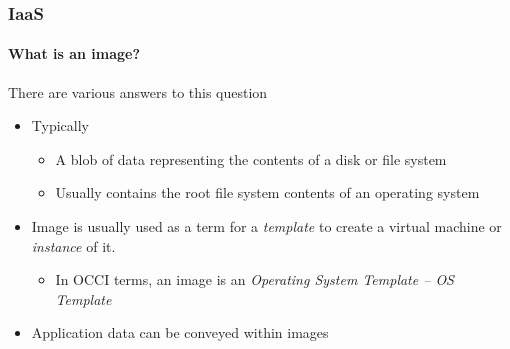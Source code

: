 \begin{frame}
\frametitle{IaaS}
\framesubtitle{What is an image?}
There are various answers to this question
\begin{itemize}
\item Typically
  \begin{itemize}
  \item A blob of data representing the contents of a disk or file system
  \item Usually contains the root file system contents of an operating system
  \end{itemize}
\item Image is usually used as a term for a \emph{template} to create
  a virtual machine or \emph{instance} of it.
  \begin{itemize}
  \item In OCCI terms, an image is an \emph{Operating System Template
    -- OS Template}
  \end{itemize}
  \item Application data can be conveyed within images
\end{itemize}
\end{frame}

